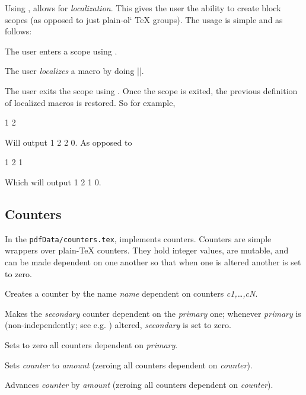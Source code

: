 Using , \pdftoolbox{} allows for {\it localization}.
This gives the user the ability to create block scopes (as opposed to just plain-ol` \TeX{} groups).
The usage is simple and as follows:
\benum
    \item The user enters a scope using \macro\beginscope.
    \item The user {\it localizes} a macro \macro\X{} by doing \inlinecode|\localize\X|.
    \item The user exits the scope using \macro\endscope.
    Once the scope is exited, the previous definition of localized macros is restored.
\eenum
So for example,

\blisting
\def\X{0}
\beginscope
    \localize\X
    \def\X{1}
    \X
    \beginscope
        \def\X{2}
        \X
    \endscope
    \X
\endscope
\X
\elisting

Will output 1 2 2 0.
As opposed to

\blisting
\def\X{0}
\bgroup
    \def\X{1}
    \X
    \bgroup
        \def\X{2}
        \X
    \egroup
    \X
\egroup
\X
\elisting

Which will output 1 2 1 0.

\subsection{Counters}

In the {\tt pdfData/counters.tex}, \pdftoolbox{} implements counters.
Counters are simple wrappers over plain-\TeX{} counters.
They hold integer values, are mutable, and can be made dependent on one another so that when one is altered another is set to zero.

Creates a counter by the name {\it name} dependent on counters {\it c1,\dots,cN}.
\emacroexp

Makes the {\it secondary} counter dependent on the {\it primary} one; whenever {\it primary} is (non-independently; see e.g. \gotomacro\seticounter) altered, {\it secondary} is set to zero.
\emacroexp

Sets to zero all counters dependent on {\it primary}.
\emacroexp

\macroexp{\setcounter {<counter>}{<amount>}}
Sets {\it counter} to {\it amount} (zeroing all counters dependent on {\it counter}).
\emacroexp

Advances {\it counter} by {\it amount} (zeroing all counters dependent on {\it counter}).
\emacroexp

